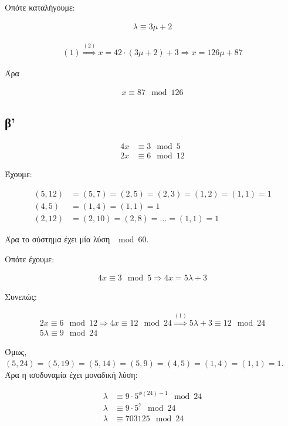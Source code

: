 \documentclass[11pt, oneside]{article}   	%
\begin{document}
 Οπότε καταλήγουμε:
 
 \begin{align}
 	\lambda \equiv 3\mu +2
 \end{align}
 
 \begin{align*}
 	(1) \stackrel{(2)}{\Rightarrow} x=42\cdot(3\mu + 2) + 3 \Rightarrow x=126\mu + 87
 \end{align*}
 
 Άρα
 
 \begin{align*}
 	x \equiv 87 \mod 126
 \end{align*}

\subsection{β'}

\begin{align*}
	4x &\equiv 3 \mod 5 \\
	2x &\equiv 6 \mod 12
\end{align*}

Έχουμε:

\begin{align*}
	(5,12) &= (5,7) = (2,5) = (2,3) = (1,2) = (1,1) = 1 \\
	(4,5) &= (1,4) = (1,1) = 1 \\
	(2,12) &= (2,10) = (2,8) = \dots = (1,1) = 1
\end{align*}

Άρα το σύστημα έχει μία λύση $\mod 60$.

Οπότε έχουμε:

\begin{align}
	4x \equiv 3 \mod 5 \Rightarrow 4x = 5\lambda + 3
\end{align}

Συνεπώς:

\begin{align*}
	2x \equiv 6 \mod 12 \Rightarrow 4x \equiv 12 \mod 24 \stackrel{(1)}{\Rightarrow} 5\lambda +3 \equiv 12 \mod 24 \\
	5\lambda \equiv 9 \mod 24
\end{align*}

Όμως, $(5,24) = (5,19) = (5,14) = (5,9) = (4,5) = (1,4) = (1,1) = 1$. Άρα η ισοδυναμία έχει μοναδική λύση:

\begin{align*}
	\lambda &\equiv 9 \cdot 5^{\phi(24)-1} \mod 24 \\
	\lambda &\equiv 9 \cdot 5^7 \mod 24 \\
	\lambda &\equiv 703125 \mod 24
\end{align*}
\end{document}
